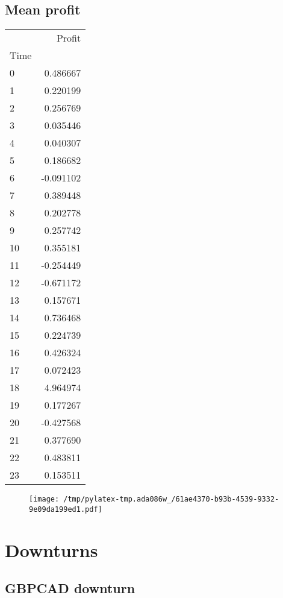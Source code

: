 \documentclass{article}%
\begin{document}
\subsection{Mean profit }%
\label{subsec:Meanprofit}%
\begin{tabular}{lr}
\toprule
{} &    Profit \\
Time &           \\
\midrule
0    &  0.486667 \\
1    &  0.220199 \\
2    &  0.256769 \\
3    &  0.035446 \\
4    &  0.040307 \\
5    &  0.186682 \\
6    & -0.091102 \\
7    &  0.389448 \\
8    &  0.202778 \\
9    &  0.257742 \\
10   &  0.355181 \\
11   & -0.254449 \\
12   & -0.671172 \\
13   &  0.157671 \\
14   &  0.736468 \\
15   &  0.224739 \\
16   &  0.426324 \\
17   &  0.072423 \\
18   &  4.964974 \\
19   &  0.177267 \\
20   & -0.427568 \\
21   &  0.377690 \\
22   &  0.483811 \\
23   &  0.153511 \\
\bottomrule
\end{tabular}
%


\begin{figure}[htbp]%
\centering%
\texttt{[image: /tmp/pylatex-tmp.ada086w\_/61ae4370-b93b-4539-9332-9e09da199ed1.pdf]}%
\end{figure}

%
\newpage %
\section{Downturns}%
\label{sec:Downturns}%
\subsection{GBPCAD downturn}%
\label{subsec:GBPCADdownturn}%
\end{document}
